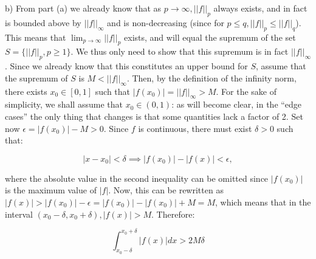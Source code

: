 \begin{solution}
    b) From part (a) we already know that as $p \rightarrow \infty, \lvert \lvert f \rvert \rvert _p$ always exists, and in fact is bounded above by $\lvert \lvert f \rvert \rvert _{\infty}$ and is non-decreasing (since for $p \leq q, \lvert \lvert f \rvert \rvert _p \leq \lvert \lvert f \rvert \rvert _q$).
    This means that $\lim_{p \rightarrow \infty} \lvert \lvert f \rvert \rvert _p$ exists, and will equal the supremum of the set $S = \{ \lvert \lvert f \rvert \rvert _{p}, p \geq 1\}$.
    We thus only need to show that this supremum is in fact $\lvert \lvert f \rvert \rvert _{\infty}$.
    Since we already know that this constitutes an upper bound for $S$, assume that the supremum of $S$ is $M < \lvert \lvert f \rvert \rvert_{\infty}$.
    Then, by the definition of the infinity norm, there exists $x_0 \in [0, 1]$ such that $\lvert f(x_0) \rvert = \lvert \lvert f \rvert \rvert _{\infty} > M$.
    For the sake of simplicity, we shall assume that $x_0 \in (0, 1)$: as will become clear, in the ``edge cases'' the only thing that changes is that some quantities lack a factor of 2.
    Set now $\epsilon = \lvert f(x_0) \rvert - M > 0$.
    Since $f$ is continuous, there must exist $\delta > 0$ such that:
    
    $$\lvert x - x_0 \rvert < \delta \implies \lvert f(x_0) \rvert - \lvert f(x) \rvert < \epsilon,$$

    where the absolute value in the second inequality can be omitted since $\lvert f(x_0) \rvert$ is the maximum value of $\lvert f \rvert$.
    Now, this can be rewritten as $\lvert f(x) \rvert > \lvert f(x_0) \rvert - \epsilon = \lvert f(x_0) \rvert - \lvert f(x_0) \rvert + M = M$, which means that in the interval $(x_0 - \delta, x_0 + \delta), \lvert f(x) \rvert > M$.
    Therefore:

    $$\int_{x_0 - \delta}^{x_0 + \delta} \lvert f(x) \rvert dx > 2M \delta$$
\end{solution}